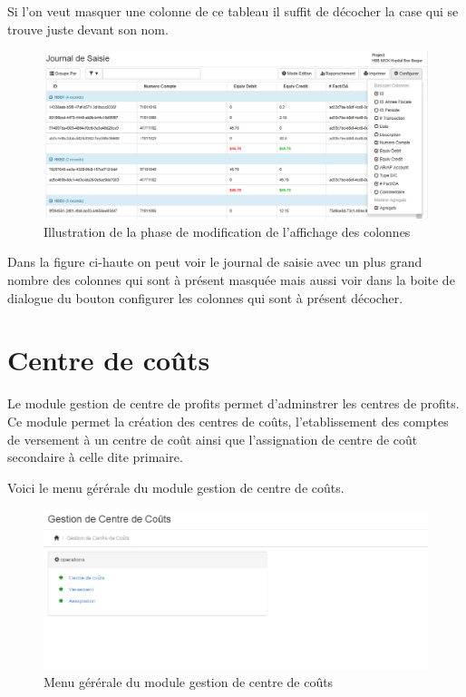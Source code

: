 \documentclass[12pt,a4paper]{report}
\begin{document}
Si l'on veut masquer une colonne de ce tableau il suffit de décocher la case qui se trouve juste devant son nom.
\begin{figure}[h]
\begin{center}
\includegraphics[width=12cm]{pic/MenuConfigurationAction.png}
\end{center}
\caption{Illustration de la phase de modification de l'affichage des colonnes}
\label{Illustration de la phase de modification de l'affichage des colonnes}
\end{figure}

Dans la figure ci-haute on peut voir le journal de saisie avec un plus grand nombre des colonnes qui sont à présent masquée mais aussi voir dans la boite de dialogue du bouton configurer les colonnes qui sont à présent décocher.

\newpage
\section{Centre de coûts}
Le module gestion de centre de profits permet d'adminstrer les centres de profits. Ce module permet la création des centres de coûts, l'etablissement des comptes de versement à un centre de coût ainsi que l'assignation de centre de coût secondaire à celle dite primaire.

Voici le menu gérérale du module gestion de centre de coûts.

\begin{figure}[h]
\begin{center}
\includegraphics[width=14cm]{pic/GestCentreCout.png}
\end{center}
\caption{Menu gérérale du module gestion de centre de coûts}
\label{Menu gérérale du module gestion de centre de coûts}
\end{figure}
\end{document}
